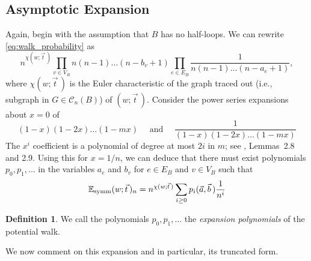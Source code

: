 \documentclass{memo-l}
\theoremstyle{plain}
\theoremstyle{definition}
\numberwithin{section}{chapter}
\numberwithin{equation}{chapter}
\newcommand{\potwalk}{(w;\vec t\,)}
\theoremstyle{plain}
\theoremstyle{definition}
\newtheorem{defn}[theorem]{Definition}
\newcommand\EE{\mathbb{E}}
\newcommand\cC{\mathcal{C}}
\begin{document}
\subsection{Asymptotic Expansion}

Again, begin with the assumption that \( B \) has no half-loops. We can
rewrite \eqref{eq:walk_probability} as \[ n^{\chi\potwalk}\prod_{v
\in V_B} n(n-1) \ldots (n-b_v+1) \prod_{e \in E_B} \frac{1}{n(n-1)\ldots
(n-a_e+1)}, \] 
where $\chi\potwalk$ is the Euler characteristic of the graph traced out
(i.e., subgraph in $G\in\cC_n(B)$) of  $\potwalk$.
Consider the power series expansions about \( x = 0 \) of \[
(1-x)(1-2x) \ldots (1-mx) \quad\text{ and }\quad \frac{1}{(1-x)(1-2x)
\ldots (1-mx)} \] The \(x^i\) coefficient is a polynomial of degree at most
\(2i\) in \(m\); see
\cite{friedman_random_graphs}, Lemmas~2.8 and 2.9.
Using this for \( x = 1/n \), we can deduce that there
must exist polynomials \(p_0, p_1, \ldots \) in the variables \(a_e\) and
\(b_v\) for \( e \in E_B \) and \( v \in V_B \) such that
\begin{equation}\label{equ:expansion_polynomials} \EE_{\rm{symm}}\potwalk_n
= n^{\chi\potwalk} \sum_{i \geq 0} p_i(\vec a, \vec b\,) \frac{1}{n^i}
\end{equation} 
\begin{defn} 
\label{de:expansion_polynomials}
We call the polynomials \( p_0, p_1, \ldots \)
the \emph{expansion polynomials} of the potential walk.  \end{defn}

We now comment on this expansion and in particular, its truncated form.
\end{document}
